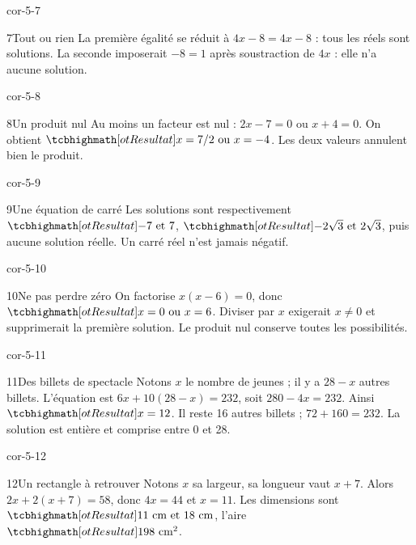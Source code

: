 \begin{blocLivre}{cor-5-7}\begin{corrige}{7}{Tout ou rien}
La première égalité se réduit à $4x-8=4x-8$ : tous les réels sont solutions. La seconde imposerait $-8=1$ après soustraction de $4x$ : elle n’a aucune solution.
\end{corrige}\end{blocLivre}
\begin{blocLivre}{cor-5-8}\begin{corrige}{8}{Un produit nul}
Au moins un facteur est nul : $2x-7=0$ ou $x+4=0$. On obtient $\res{x=7/2\text{ ou }x=-4}$. Les deux valeurs annulent bien le produit.
\end{corrige}\end{blocLivre}
\begin{blocLivre}{cor-5-9}\begin{corrige}{9}{Une équation de carré}
Les solutions sont respectivement $\res{-7\text{ et }7}$, $\res{-2\sqrt3\text{ et }2\sqrt3}$, puis aucune solution réelle. Un carré réel n’est jamais négatif.
\end{corrige}\end{blocLivre}
\begin{blocLivre}{cor-5-10}\begin{corrige}{10}{Ne pas perdre zéro}
On factorise $x(x-6)=0$, donc $\res{x=0\text{ ou }x=6}$. Diviser par $x$ exigerait $x\ne0$ et supprimerait la première solution. Le produit nul conserve toutes les possibilités.
\end{corrige}\end{blocLivre}
\begin{blocLivre}{cor-5-11}\begin{corrige}{11}{Des billets de spectacle}
Notons $x$ le nombre de jeunes ; il y a $28-x$ autres billets. L’équation est $6x+10(28-x)=232$, soit $280-4x=232$. Ainsi $\res{x=12}$. Il reste 16 autres billets ; $72+160=232$. La solution est entière et comprise entre 0 et 28.
\end{corrige}\end{blocLivre}
\begin{blocLivre}{cor-5-12}\begin{corrige}{12}{Un rectangle à retrouver}
Notons $x$ sa largeur, sa longueur vaut $x+7$. Alors $2x+2(x+7)=58$, donc $4x=44$ et $x=11$. Les dimensions sont $\res{11\text{ cm et }18\text{ cm}}$, l’aire $\res{198\text{ cm}^2}$.
\label{fig-cor-5-12}
\end{corrige}\end{blocLivre}
